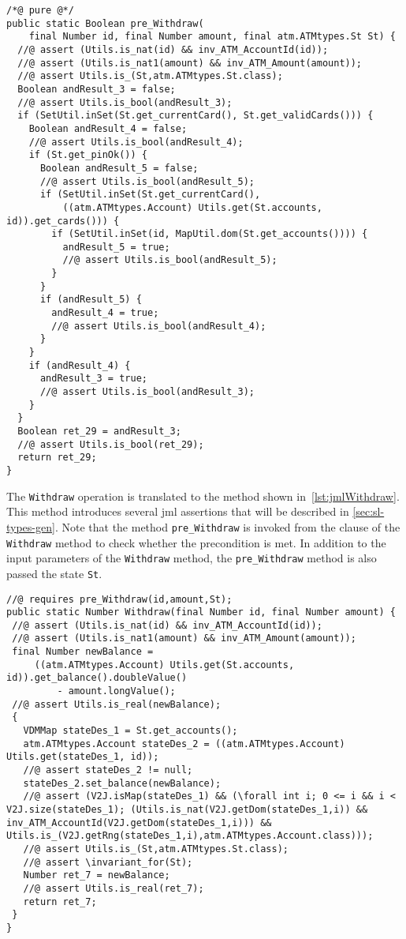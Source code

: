 \begin{lstlisting}[float=*,style=customJml,caption={Code-generated version of
the \texttt{pre\_Withdraw} operation.},label={lst:jmlPreWithdraw}]
/*@ pure @*/
public static Boolean pre_Withdraw(
    final Number id, final Number amount, final atm.ATMtypes.St St) {
  //@ assert (Utils.is_nat(id) && inv_ATM_AccountId(id));
  //@ assert (Utils.is_nat1(amount) && inv_ATM_Amount(amount));
  //@ assert Utils.is_(St,atm.ATMtypes.St.class);
  Boolean andResult_3 = false;
  //@ assert Utils.is_bool(andResult_3);
  if (SetUtil.inSet(St.get_currentCard(), St.get_validCards())) {
    Boolean andResult_4 = false;
    //@ assert Utils.is_bool(andResult_4);
    if (St.get_pinOk()) {
      Boolean andResult_5 = false;
      //@ assert Utils.is_bool(andResult_5);
      if (SetUtil.inSet(St.get_currentCard(),
          ((atm.ATMtypes.Account) Utils.get(St.accounts, id)).get_cards())) {
        if (SetUtil.inSet(id, MapUtil.dom(St.get_accounts()))) {
          andResult_5 = true;
          //@ assert Utils.is_bool(andResult_5);
        }
      }
      if (andResult_5) {
        andResult_4 = true;
        //@ assert Utils.is_bool(andResult_4);
      }
    }
    if (andResult_4) {
      andResult_3 = true;
      //@ assert Utils.is_bool(andResult_3);
    }
  }
  Boolean ret_29 = andResult_3;
  //@ assert Utils.is_bool(ret_29);
  return ret_29;
}
\end{lstlisting}

The \texttt{Withdraw} operation is translated to the method shown
in~\autoref{lst:jmlWithdraw}. This method introduces several \ac{jml}
assertions that will be described in \autoref{sec:sl-types-gen}. Note
that the method \texttt{pre\_Withdraw} is invoked from the
 clause of the \texttt{Withdraw} method to check whether
the precondition is met. In addition to the input parameters of the
\texttt{Withdraw} method, the \texttt{pre\_Withdraw} method is also
passed the state \texttt{St}.

\begin{lstlisting}[float=*,style=customJml,caption={Code-generated version of
the \texttt{Withdraw} operation.},label={lst:jmlWithdraw}]
//@ requires pre_Withdraw(id,amount,St);
public static Number Withdraw(final Number id, final Number amount) {
 //@ assert (Utils.is_nat(id) && inv_ATM_AccountId(id));
 //@ assert (Utils.is_nat1(amount) && inv_ATM_Amount(amount));
 final Number newBalance =
     ((atm.ATMtypes.Account) Utils.get(St.accounts, id)).get_balance().doubleValue()
         - amount.longValue();
 //@ assert Utils.is_real(newBalance);
 {
   VDMMap stateDes_1 = St.get_accounts();
   atm.ATMtypes.Account stateDes_2 = ((atm.ATMtypes.Account) Utils.get(stateDes_1, id));
   //@ assert stateDes_2 != null;
   stateDes_2.set_balance(newBalance);
   //@ assert (V2J.isMap(stateDes_1) && (\forall int i; 0 <= i && i < V2J.size(stateDes_1); (Utils.is_nat(V2J.getDom(stateDes_1,i)) && inv_ATM_AccountId(V2J.getDom(stateDes_1,i))) && Utils.is_(V2J.getRng(stateDes_1,i),atm.ATMtypes.Account.class)));
   //@ assert Utils.is_(St,atm.ATMtypes.St.class);
   //@ assert \invariant_for(St);
   Number ret_7 = newBalance;
   //@ assert Utils.is_real(ret_7);
   return ret_7;
 }
}
\end{lstlisting}

